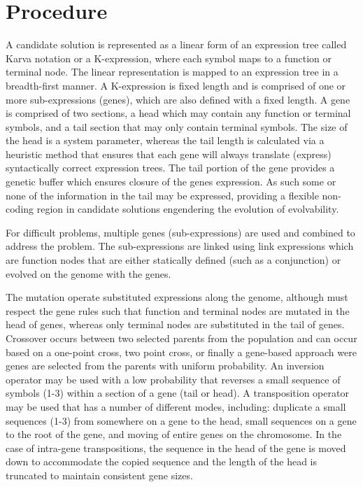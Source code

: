 \documentclass[a4paper, 11pt]{article}
\begin{document}
\section{Procedure}
\label{sec:procedure}
A candidate solution is represented as a linear form of an expression tree called Karva notation or a K-expression, where each symbol maps to a function or terminal node. The linear representation is mapped to an expression tree in a breadth-first manner. 
A K-expression is fixed length and is comprised of one or more sub-expressions (genes), which are also defined with a fixed length. A gene is comprised of two sections, a head which may contain any function or terminal symbols, and a tail section that may only contain terminal symbols. The size of the head is a system parameter, whereas the tail length is calculated via a heuristic method that ensures that each gene will always translate (express) syntactically correct expression trees. The tail portion of the gene provides a genetic buffer which ensures closure of the genes expression. As such some or none of the information in the tail may be expressed, providing a flexible non-coding region in candidate solutions engendering the evolution of evolvability. 

For difficult problems, multiple genes (sub-expressions) are used and combined to address the problem. The sub-expressions are linked using link expressions which are function nodes that are either statically defined (such as a conjunction) or evolved on the genome with the genes.

The mutation operate substituted expressions along the genome, although must respect the gene rules such that function and terminal nodes are mutated in the head of genes, whereas only terminal nodes are substituted in the tail of genes. Crossover occurs between two selected parents from the population and can occur based on a one-point cross, two point cross, or finally a gene-based approach were genes are selected from the parents with uniform probability.
An inversion operator may be used with a low probability that reverses a small sequence of symbols (1-3) within a section of a gene (tail or head). A transposition operator may be used that has a number of different modes, including: duplicate a small sequences (1-3) from somewhere on a gene to the head, small sequences on a gene to the root of the gene, and moving of entire genes on the chromosome. In the case of intra-gene transpositions, the sequence in the head of the gene is moved down to accommodate the copied sequence and the length of the head is truncated to maintain consistent gene sizes.
\end{document}
